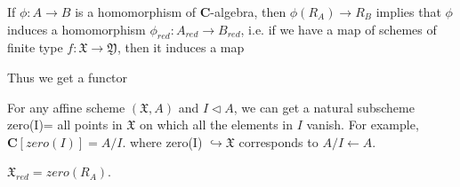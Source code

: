 \documentclass[
11pt, %
letterpaper， %
oneside, %
headinclude,footinclude, %
BCOR5mm, %
]{scrartcl}
\newcommand{\C}{{\mathbf{C}}}
\newcommand{\var}{\mathsf{Var}}
\newcommand{\sch}{\mathsf{Sch}}
\newcommand{\aff}{\mathsf{Aff}}
\begin{document}
If $\phi: A\to B$ is a homomorphism of $\C$-algebra, then $\phi(R_A)\to R_B$ implies that $\phi$  induces a homomorphism $\phi_{red}:A_{red}\to B_{red}$, i.e. if we have a map of schemes of finite type $f:\mathfrak{X}\to \mathfrak{Y}$, then it induces a map
\begin{center}
\end{center}

Thus we get a functor 
\begin{center}
\end{center}

For any affine scheme $(\mathfrak{X},A)$ and $I\lhd A$, we can get a natural subscheme zero(I)= all points in $\mathfrak{X}$ on which all the elements in $I$ vanish. For example, $\C[zero(I)]=A/I$. where zero(I) $\hookrightarrow \mathfrak{X}$ corresponds to $A/I \leftarrow A$.

\begin{exercise}
	$\mathfrak{X}_{red}=zero(R_A)$.
\end{exercise} 
\end{document}
